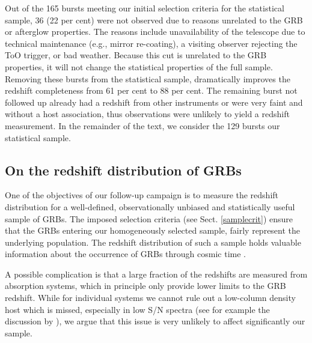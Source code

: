 \documentclass[longauth]{aa}    %
\begin{document}
Out of the 165 bursts meeting our initial selection criteria for the statistical
sample, 36 (22 per cent) were not observed due to reasons unrelated to the GRB
or afterglow properties. The reasons include unavailability of the telescope due
to technical maintenance (e.g., mirror re-coating), a visiting observer
rejecting the ToO trigger, or bad weather. Because this cut is unrelated to the
GRB properties, it will not change the statistical properties of the full
sample. Removing these bursts from the statistical sample, dramatically improves
the redshift completeness from 61 per cent to 88 per cent. The remaining burst
not followed up already had a redshift from other instruments or were very faint
and without a host association, thus observations were unlikely to yield a redshift
measurement. In the remainder of the text, we consider the 129 bursts our
statistical sample.

\subsection{On the redshift distribution of GRBs} \label{redshift}

One of the objectives of our follow-up campaign is to measure the redshift
distribution for a well-defined, observationally unbiased and statistically useful
sample of GRBs. The imposed selection criteria (see Sect. \ref{samplecrit})
ensure that the GRBs entering our homogeneously selected sample, fairly represent the
underlying population. The redshift distribution of such a sample holds valuable
information about the occurrence of GRBs through cosmic time
\citep{Jakobsson2012, Perley2016a}.

A possible complication is that a large fraction of the redshifts are 
measured from absorption systems, which in principle only provide lower 
limits to the GRB redshift. While for individual systems we cannot rule 
out a low-column density host which is missed, especially in low S/N 
spectra (see for example the discussion by 
\citealt{2008ApJ...688..470P, Perley2017a}), we argue that this issue is very 
unlikely to affect significantly our sample. 
\end{document}
